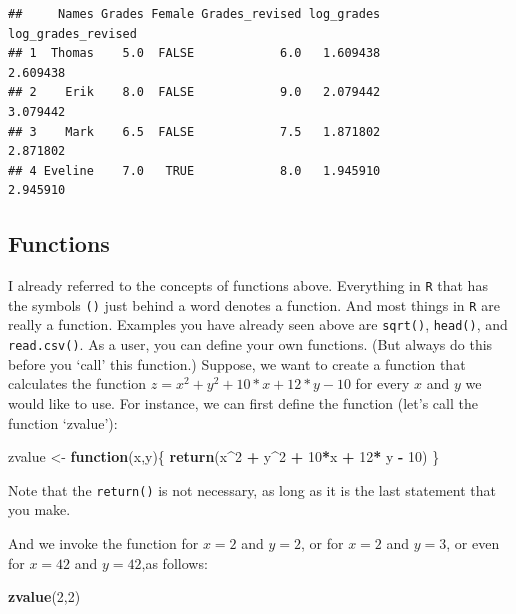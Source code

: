 \documentclass[]{article}
\newenvironment{Shaded}{\begin{snugshade}}{\end{snugshade}}
\newcommand{\KeywordTok}[1]{\textcolor[rgb]{0.13,0.29,0.53}{\textbf{#1}}}
\newcommand{\DecValTok}[1]{\textcolor[rgb]{0.00,0.00,0.81}{#1}}
\newcommand{\StringTok}[1]{\textcolor[rgb]{0.31,0.60,0.02}{#1}}
\newcommand{\ControlFlowTok}[1]{\textcolor[rgb]{0.13,0.29,0.53}{\textbf{#1}}}
\newcommand{\OperatorTok}[1]{\textcolor[rgb]{0.81,0.36,0.00}{\textbf{#1}}}
\newcommand{\NormalTok}[1]{#1}
\theoremstyle{definition}
\theoremstyle{definition}
\theoremstyle{definition}
\theoremstyle{remark}
\begin{document}
\begin{verbatim}
##     Names Grades Female Grades_revised log_grades log_grades_revised
## 1  Thomas    5.0  FALSE            6.0   1.609438           2.609438
## 2    Erik    8.0  FALSE            9.0   2.079442           3.079442
## 3    Mark    6.5  FALSE            7.5   1.871802           2.871802
## 4 Eveline    7.0   TRUE            8.0   1.945910           2.945910
\end{verbatim}

\subsection{Functions}\label{functions}

I already referred to the concepts of functions above. Everything in
\texttt{R} that has the symbols \texttt{()} just behind a word denotes a
function. And most things in \texttt{R} are really a function. Examples
you have already seen above are \texttt{sqrt()}, \texttt{head()}, and
\texttt{read.csv()}. As a user, you can define your own functions. (But
always do this before you `call' this function.) Suppose, we want to
create a function that calculates the function
\(z = x^2 + y^2 + 10*x + 12* y - 10\) for every \(x\) and \(y\) we would
like to use. For instance, we can first define the function (let's call
the function `zvalue'):

\begin{Shaded}
\begin{Highlighting}[]
\NormalTok{zvalue <-}\StringTok{ }\ControlFlowTok{function}\NormalTok{(x,y)\{}
  \KeywordTok{return}\NormalTok{(x}\OperatorTok{^}\DecValTok{2} \OperatorTok{+}\StringTok{ }\NormalTok{y}\OperatorTok{^}\DecValTok{2} \OperatorTok{+}\StringTok{ }\DecValTok{10}\OperatorTok{*}\NormalTok{x }\OperatorTok{+}\StringTok{ }\DecValTok{12}\OperatorTok{*}\StringTok{ }\NormalTok{y }\OperatorTok{-}\StringTok{ }\DecValTok{10}\NormalTok{)}
\NormalTok{\}}
\end{Highlighting}
\end{Shaded}

Note that the \texttt{return()} is not necessary, as long as it is the
last statement that you make.

And we invoke the function for \(x=2\) and \(y=2\), or for \(x=2\) and
\(y=3\), or even for \(x=42\) and \(y=42\),as follows:

\begin{Shaded}
\begin{Highlighting}[]
\KeywordTok{zvalue}\NormalTok{(}\DecValTok{2}\NormalTok{,}\DecValTok{2}\NormalTok{)}
\end{Highlighting}
\end{Shaded}
\end{document}
